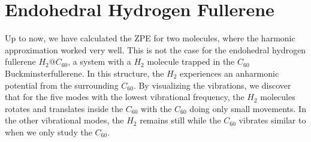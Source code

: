 \documentclass [12pt]{report}
\begin{document}
\section{Endohedral Hydrogen Fullerene}
Up to now, we have calculated the ZPE for two molecules, where the harmonic approximation worked very well. This is not the case for the endohedral hydrogen fullerene $H_2@C_{60}$\cite{h2@c60,h2@c60_anharmonic}, a system with a $H_2$ molecule trapped in the $C_{60}$ Buckminsterfullerene. In this structure, the $H_2$ experiences an anharmonic potential from the surrounding $C_{60}$. By visualizing the vibrations, we discover that for the five modes with the lowest vibrational frequency, the $H_2$ molecules rotates and translates inside the $C_{60}$ with the $C_{60}$ doing only small movements. In the other vibrational modes, the $H_2$ remains still while the $C_{60}$ vibrates similar to when we only study the $C_{60}$.\\
\end{document}
